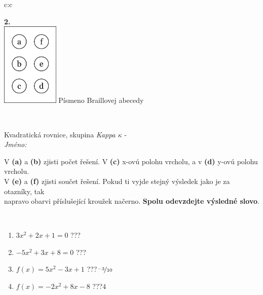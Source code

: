 \documentclass[10pt]{report}
\begin{document}
\begin{tabular}{c:c}
\begin{minipage}[c][104.5mm][t]{0.5\linewidth}
\begin{center}
\begin{minipage}{0.20\linewidth}
\begin{center}
{\Huge\bfseries 2.} \\[2mm]
\includegraphics[height=40mm]{../images/braille.png}
{\small Písmeno Braillovej abecedy}
\end{center}
\end{minipage}
\end{center}
\end{minipage}
\\ \hdashline
\begin{minipage}[c][104.5mm][t]{0.5\linewidth}
\begin{center}
\vspace{7mm}
{\huge Kvadratická rovnice, skupina \textit{Kappa $\kappa$} -}\\[5mm]
\textit{Jméno:}\phantom{xxxxxxxxxxxxxxxxxxxxxxxxxxxxxxxxxxxxxxxxxxxxxxxxxxxxxxxxxxxxxxxxx}\\[5mm]
\begin{minipage}{0.95\linewidth}
\begin{center}
V \textbf{(a)} a \textbf{(b)} zjisti počet řešení. V \textbf{(c)} x-ovú polohu vrcholu, a v \textbf{(d)} y-ovú polohu vrcholu.\\V \textbf{(e)} a \textbf{(f)} zjisti součet řešení. Pokud ti vyjde stejný výsledek jako je za otazníky, tak\\napravo obarvi příslušející kroužek načerno. \textbf{Spolu odevzdejte výsledné slovo}.
\end{center}
\end{minipage}
\\[1mm]
\begin{minipage}{0.79\linewidth}
\begin{center}
\begin{varwidth}{\linewidth}
\begin{enumerate}
\Large
\item $3x^2+2x+1=0$\quad \dotfill\; ???\;\dotfill {}
\item $-5x^2+3x+8=0$\quad \dotfill\; ???\;\dotfill {}
\item $f(x)=5x^2-3x+1$\quad \dotfill\; ???\;\dotfill \quad $\nicefrac{-3}{10}$
\item $f(x)=-2x^2+8x-8$\quad \dotfill\; ???\;\dotfill \quad $4$

\end{enumerate}
\end{varwidth}
\end{center}
\end{minipage}
\end{center}
\end{minipage}
\end{tabular}
\end{document}
